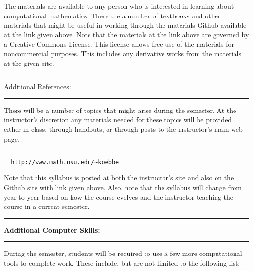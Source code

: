 \documentclass[10pt,fleqn]{article}
\begin{document}
\noindent
The materials are available to any person who is interested in learning about
computational mathematics. There are a number of textbooks and other materials
that might be useful in working through the materials Github available at the
link given above. Note that the materials at the link above are governed by a
Creative Commons License. This license allows free use of the materials for
noncommercial purposes. This includes any derivative works from the materials at
the given site.
\vskip0.1in\hrule\vskip0.1in
\noindent
\underline{Additional References:}
\vskip0.1in\hrule\vskip0.1in
\noindent
There will be a number of topics that might arise during the semester. At the
instructor's discretion any materials needed for these topics will be provided
either in class, through handouts, or through posts to the instructor's main
web page.
\begin{verbatim}

  http://www.math.usu.edu/~koebbe

\end{verbatim}
Note that this syllabus is posted at both the instructor's site and also on the
Github site with link given above. Also, note that the syllabus will change from
year to year based on how the course evolves and the instructor teaching the
course in a current semester.
\vskip0.1in\hrule\vskip0.1in \noindent
{\bf Additional Computer Skills:}
\vskip0.1in\hrule\vskip0.1in
\noindent
During the semester, students will be required to use a few more computational
tools to complete work. These include, but are not limited to the following
list:

\medskip
\end{document}
